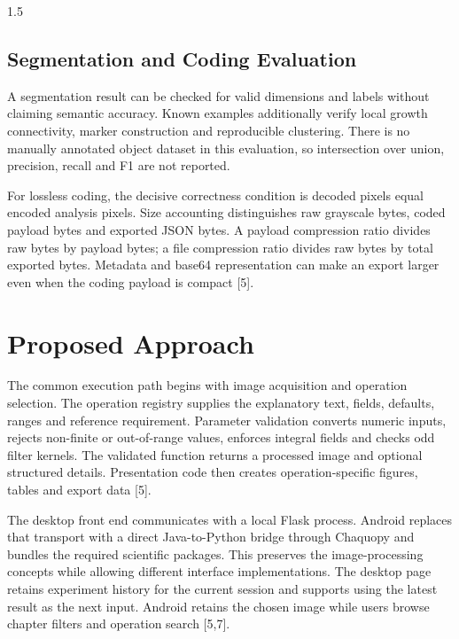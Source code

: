 \begin{spacing}{1.5}
\subsection{Segmentation and Coding Evaluation}
A segmentation result can be checked for valid dimensions and labels without claiming semantic accuracy. Known examples additionally verify local growth connectivity, marker construction and reproducible clustering. There is no manually annotated object dataset in this evaluation, so intersection over union, precision, recall and F1 are not reported.

For lossless coding, the decisive correctness condition is decoded pixels equal encoded analysis pixels. Size accounting distinguishes raw grayscale bytes, coded payload bytes and exported JSON bytes. A payload compression ratio divides raw bytes by payload bytes; a file compression ratio divides raw bytes by total exported bytes. Metadata and base64 representation can make an export larger even when the coding payload is compact [5].

\section{Proposed Approach}
The common execution path begins with image acquisition and operation selection. The operation registry supplies the explanatory text, fields, defaults, ranges and reference requirement. Parameter validation converts numeric inputs, rejects non-finite or out-of-range values, enforces integral fields and checks odd filter kernels. The validated function returns a processed image and optional structured details. Presentation code then creates operation-specific figures, tables and export data [5].

The desktop front end communicates with a local Flask process. Android replaces that transport with a direct Java-to-Python bridge through Chaquopy and bundles the required scientific packages. This preserves the image-processing concepts while allowing different interface implementations. The desktop page retains experiment history for the current session and supports using the latest result as the next input. Android retains the chosen image while users browse chapter filters and operation search [5,7].


\end{spacing}
